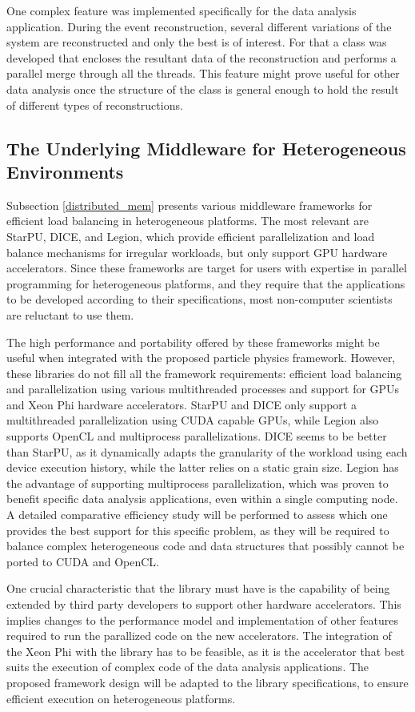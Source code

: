 One complex feature was implemented specifically for the \ttH data analysis application. During the event reconstruction, several different variations of the system are reconstructed and only the best is of interest. For that a class was developed that encloses the resultant data of the reconstruction and performs a parallel merge through all the threads. This feature might prove useful for other data analysis once the structure of the class is general enough to hold the result of different types of reconstructions.

\subsection{The Underlying Middleware for Heterogeneous Environments}
\label{middleware}

Subsection \ref{distributed_mem} presents various middleware frameworks for efficient load balancing in heterogeneous platforms. The most relevant are StarPU, DICE, and Legion, which provide efficient parallelization and load balance mechanisms for irregular workloads, but only support GPU hardware accelerators. Since these frameworks are target for users with expertise in parallel programming for heterogeneous platforms, and they require that the applications to be developed according to their specifications, most non-computer scientists are reluctant to use them.

The high performance and portability offered by these frameworks might be useful when integrated with the proposed particle physics framework. However, these libraries do not fill all the framework requirements: efficient load balancing and parallelization using various multithreaded processes and support for GPUs and \intel Xeon Phi hardware accelerators. StarPU and DICE only support a multithreaded parallelization using CUDA capable GPUs, while Legion also supports OpenCL and multiprocess parallelizations. DICE seems to be better than StarPU, as it dynamically adapts the granularity of the workload using each device execution history, while the latter relies on a static grain size. Legion has the advantage of supporting multiprocess parallelization, which was proven to benefit specific data analysis applications, even within a single computing node. A detailed comparative efficiency study will be performed to assess which one provides the best support for this specific problem, as they will be required to balance complex heterogeneous code and data structures that possibly cannot be ported to CUDA and OpenCL.

One crucial characteristic that the library must have is the capability of being extended by third party developers to support other hardware accelerators. This implies changes to the performance model and implementation of other features required to run the parallized code on the new accelerators. The integration of the \intel Xeon Phi with the library has to be feasible, as it is the accelerator that best suits the execution of complex code of the data analysis applications. The proposed framework design will be adapted to the library specifications, to ensure efficient execution on heterogeneous platforms.
